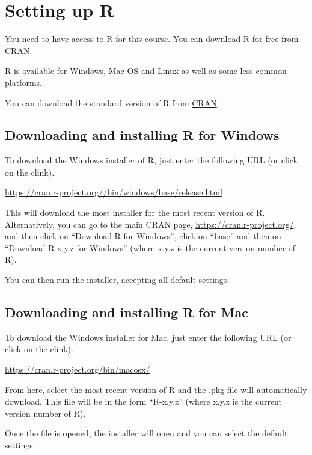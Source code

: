 \documentclass[
]{book}
\begin{document}
\hypertarget{setting-up-r}{%
\section{Setting up R}\label{setting-up-r}}

You need to have access to \href{https://www.r-project.org/}{R} for this course. You can download R for free from \href{https://cran.r-project.org/}{CRAN}.

R is available for Windows, Mac OS and Linux as well as some less common platforms.

You can download the standard version of R from \href{https://cran.r-project.org/}{CRAN}.

\hypertarget{downloading-and-installing-r-for-windows}{%
\subsection{Downloading and installing R for Windows}\label{downloading-and-installing-r-for-windows}}

To download the Windows installer of R, just enter the following URL (or click on the clink).

\url{https://cran.r-project.org//bin/windows/base/release.html}

This will download the most installer for the most recent version of R. Alternatively, you can go to the main CRAN page, \url{https://cran.r-project.org/}, and then click on ``Download R for Windows'', click on ``base'' and then on ``Download R x.y.z for Windows'' (where x.y.z is the current version number of R).

You can then run the installer, accepting all default settings.

\hypertarget{downloading-and-installing-r-for-mac}{%
\subsection{Downloading and installing R for Mac}\label{downloading-and-installing-r-for-mac}}

To download the Windows installer for Mac, just enter the following URL (or click on the clink).

\url{https://cran.r-project.org/bin/macosx/}

From here, select the most recent version of R and the .pkg file will automatically download. This file will be in the form ``R-x.y.z'' (where x.y.z is the current version number of R).

Once the file is opened, the installer will open and you can select the default settings.
\end{document}
